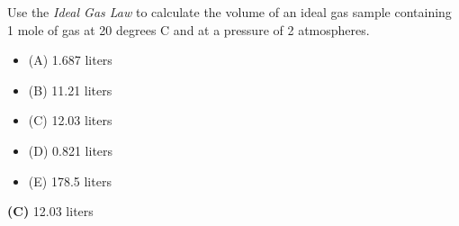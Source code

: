 

Use the {\it Ideal Gas Law} to calculate the volume of an ideal gas sample containing 1 mole of gas at 20 degrees C and at a pressure of 2 atmospheres. 

\begin{itemize}
\item{(A)} 1.687 liters
\vskip 5pt 
\item{(B)} 11.21 liters
\vskip 5pt 
\item{(C)} 12.03 liters
\vskip 5pt 
\item{(D)} 0.821 liters
\vskip 5pt 
\item{(E)} 178.5 liters
\end{itemize}







{\bf (C)} 12.03 liters
 










